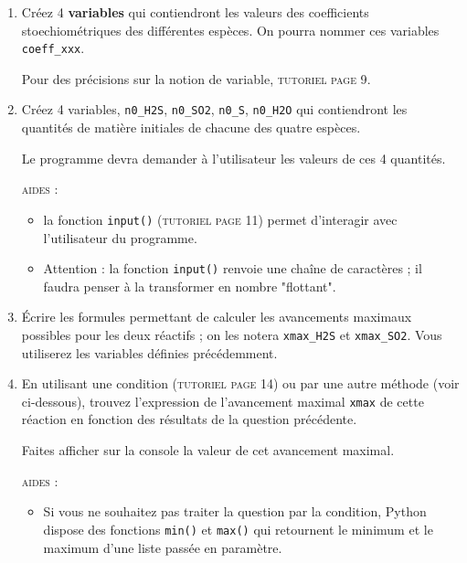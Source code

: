 \documentclass[11pt]{article}
\begin{document}
\begin{enumerate}
\item Créez 4 \textbf{variables} qui contiendront les valeurs des coefficients stoechiométriques des différentes espèces. On pourra nommer ces variables \texttt{coeff\_xxx}.

\smallskip
Pour des précisions sur la notion de variable, \textsc{tutoriel page 9}.




\medskip

 \item Créez 4 variables, \texttt{n0\_H2S}, \texttt{n0\_SO2}, \texttt{n0\_S}, \texttt{n0\_H2O} qui contiendront les quantités de matière initiales de chacune des quatre espèces.
 
Le programme devra demander à l'utilisateur les valeurs de ces 4 quantités.

\smallskip
\textsc{aides : }
\begin{itemize}
 \item la fonction \texttt{input()} (\textsc{tutoriel page 11}) permet d'interagir avec l'utilisateur du programme.
 \item Attention : la fonction \texttt{input()} renvoie une chaîne de caractères ; il faudra penser à la transformer en nombre "flottant".
\end{itemize}


\medskip

 \item Écrire les formules permettant de calculer les avancements maximaux possibles pour les deux réactifs ; on les notera \texttt{xmax\_H2S} et \texttt{xmax\_SO2}. Vous utiliserez les variables définies précédemment.
 

 
 \medskip
 
 \item En utilisant une condition (\textsc{tutoriel page 14}) ou par une autre méthode (voir ci-dessous), trouvez l'expression de l'avancement maximal \texttt{xmax} de cette réaction en fonction des résultats de la question précédente. 
 
 Faites afficher sur la console la valeur de cet avancement maximal.
 
 \smallskip
 \textsc{aides : }
\begin{itemize} 
\item Si vous ne souhaitez pas traiter la question par la condition, Python dispose des fonctions \texttt{min()} et \texttt{max()} qui retournent le minimum et le maximum d'une liste passée en paramètre.



\end{itemize}
\end{enumerate}
\end{document}

